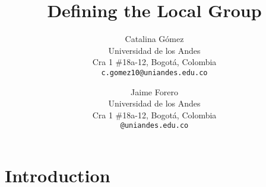 \documentclass[10pt,twocolumn,letterpaper]{article}
\begin{document}
\title{Defining the Local Group}

\author{Catalina G\'omez\\
Universidad de los Andes \\
Cra 1 \#18a-12, Bogot\'a, Colombia\\
{\tt\small c.gomez10@uniandes.edu.co}
\and 
Jaime Forero\\
Universidad de los Andes\\
Cra 1 \#18a-12, Bogot\'a, Colombia\\
{\tt\small @uniandes.edu.co}
}

\maketitle

 \begin{abstract}

 \end{abstract}


\section{Introduction}
 


{\small



}

\pagebreak
\end{document}
